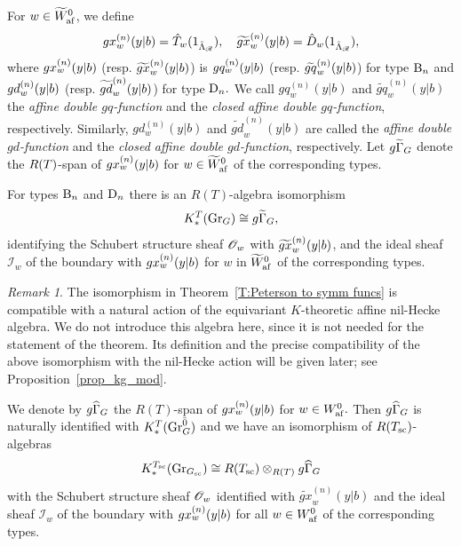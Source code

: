 \documentclass[a4paper]{amsart}
\theoremstyle{remark}
\newtheorem{remark}[thm]{Remark}
\numberwithin{equation}{section}
\begin{document}
For $w\in \Wxgr$, we define
\begin{equation}
\gx{w}{n}(y| b)=\hat{T}_w (1_{\hL_{\sR}}),
\quad
\tgx{w}{n}(y| b)=\hat{D}_w (1_{\hL_{\sR}}),
\end{equation}
where $\gx{w}{n}(y| b)$ (resp. $\tgx{w}{n}(y| b)$) is
$\gq{w}{n}(y| b)$ (resp. $\tgq{w}{n}(y| b)$) for type $\B{n}$
and $\gd{w}{n}(y| b)$ (resp. $\tgd{w}{n}(y| b)$) for type $\D{n}.$ We call \(gq^{(n)}_w(y| b)\) and \(\widetilde{gq}^{(n)}_w(y| b)\) the \emph{affine double \(gq\)-function} and the \emph{closed affine double \(gq\)-function}, respectively. Similarly, \(gd^{(n)}_w(y| b)\) and \(\widetilde{gd}^{(n)}_w(y| b)\) are called the \emph{affine double \(gd\)-function} and the \emph{closed affine double \(gd\)-function}, respectively. Let $\gGtil_{G}$ denote the $\RT$-span of $\gx{w}{n}(y| b)$ for $w\in \Wafexgr$ of the corresponding types.

\begin{thmA}\label{thm_main} 
For types $\B{n}$ and $\D{n}$ there is an $R(T)$-algebra isomorphism
$$K_*^T(\Gr_G)\cong \gGtil_{G},$$ identifying the 
Schubert structure sheaf $\cO{w}$ %
with
$\tgx{w}{n}(y| b)$, %
and the ideal sheaf $\mathscr{I}_w$ of the boundary with $\gx{w}{n}(y| b)$ for $w$ in $\Wafexgr$ of the corresponding types.
\end{thmA}
\begin{remark}
The isomorphism in Theorem~\ref{T:Peterson to symm funcs} is compatible with a natural action of the equivariant $K$-theoretic affine nil-Hecke algebra. We do not introduce this algebra here, since it is not needed for the statement of the theorem. Its definition and the precise compatibility of the above isomorphism with the nil-Hecke action will be given later; see Proposition~\ref{prop_kg_mod}.
\end{remark}


We denote by $\gGhat_{G}$ the $R(T)$-span of $\gx{w}{n}(y| b)$ for $w\in \Wafgr.$  Then $\gGhat_{G}$ is naturally identified with $K_*^{\Tad}(\Gr_{\Gad}^{\bar{0}})$ and we have an isomorphism of $R(\Tsc)$-algebras
\begin{equation*}
K_*^{\Tsc}(\Gr_{\Gsc})\cong R(\Tsc)\otimes_{R(\Tad)}{\gGhat_{G}}
\end{equation*}
with the Schubert structure sheaf $\cO{w}$
identified with $\widetilde{gx}_w^{(n)}(y| b)$ and the ideal sheaf $\mathscr{I}_w$ of the boundary with $\gx{w}{n}(y| b)$ for all $w\in \Wafgr$ of the corresponding types. 
\end{document}
